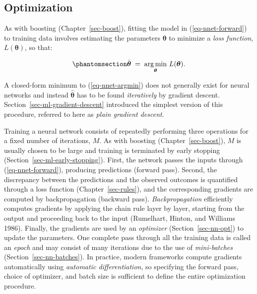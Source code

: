 \documentclass[
  letterpaper,
  krantz2]{style/krantz}
\begin{document}
\subsection{Optimization}\label{sec-nnet-optimization}

As with boosting (Chapter~\ref{sec-boost}), fitting the model in
(\ref{eq-nnet-forward}) to training data involves estimating the
parameters \(\boldsymbol{\theta}\) to minimize a \emph{loss function},
\(L(\boldsymbol{\theta})\), so that:

\begin{equation}\phantomsection\label{eq-nnet-argmin}{
\hat{\boldsymbol{\theta}} \;=\; \mathop{\mathrm{arg\,min}}_{\boldsymbol{\theta}}\, L(\boldsymbol{\theta}).
}\end{equation}

A closed-form minimum to (\ref{eq-nnet-argmin}) does not generally exist
for neural networks and instead \(\hat{\boldsymbol{\theta}}\) has to be
found \emph{iteratively} by gradient descent.
Section~\ref{sec-ml-gradient-descent} introduced the simplest version of
this procedure, referred to here as \emph{plain gradient
descent}.

Training a neural network consists of repeatedly performing three
operations for a fixed number of iterations,
\(M\). As with boosting
(Chapter~\ref{sec-boost}), \(M\) is usually chosen to be large and
training is terminated by early stopping
(Section~\ref{sec-ml-early-stopping}). First, the
network passes the inputs through (\ref{eq-nnet-forward}), producing
predictions (forward pass). Second, the discrepancy between the
predictions and the observed outcomes is quantified through a loss
function (Chapter~\ref{sec-rules}), and the corresponding gradients are
computed by backpropagation
(backward pass). \emph{Backpropagation} efficiently computes gradients
by applying the chain rule layer by layer, starting from the output and
proceeding back to the input (Rumelhart, Hinton, and Williams 1986).
Finally, the gradients are used by an \emph{optimizer}
(Section~\ref{sec-nn-opt}) to update the parameters. One complete pass
through all the training data is called an \emph{epoch} and may consist
of many iterations due to the use of \emph{mini-batches}
(Section~\ref{sec-nn-batches}).
 In
practice, modern frameworks compute gradients automatically using
\emph{automatic differentiation}, so specifying the forward pass, choice
of optimizer, and batch size is sufficient to define the entire
optimization procedure.
\end{document}
